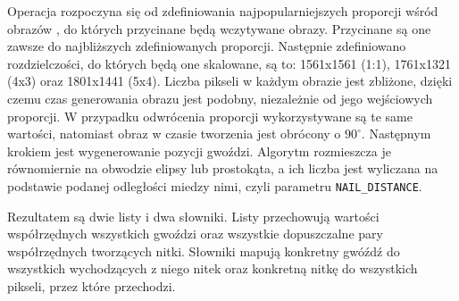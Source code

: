     Operacja rozpoczyna się od zdefiniowania najpopularniejszych proporcji wśród obrazów \cite{aspect-ratio-youtube}, do których przycinane będą wczytywane obrazy. Przycinane są one zawsze do najbliższych zdefiniowanych proporcji. Następnie zdefiniowano rozdzielczości, do których będą one skalowane, są to: 1561x1561 (1:1), 1761x1321 (4x3) oraz 1801x1441 (5x4). Liczba pikseli w każdym obrazie jest zbliżone, dzięki czemu czas generowania obrazu jest podobny, niezależnie od jego wejściowych proporcji. W przypadku odwrócenia proporcji wykorzystywane są te same wartości, natomiast obraz w czasie tworzenia jest obrócony o $90^\circ$. Następnym krokiem jest wygenerowanie pozycji gwoździ. Algorytm rozmieszcza je równomiernie na obwodzie elipsy lub prostokąta, a ich liczba jest wyliczana na podstawie podanej odległości miedzy nimi, czyli parametru \texttt{NAIL_DISTANCE}.
    
    Rezultatem są dwie listy i dwa słowniki. Listy przechowują wartości współrzędnych wszystkich gwoździ oraz wszystkie dopuszczalne pary współrzędnych tworzących nitki. Słowniki mapują konkretny gwóźdź do wszystkich wychodzących z niego nitek oraz konkretną nitkę do wszystkich pikseli, przez które przechodzi. 
    
